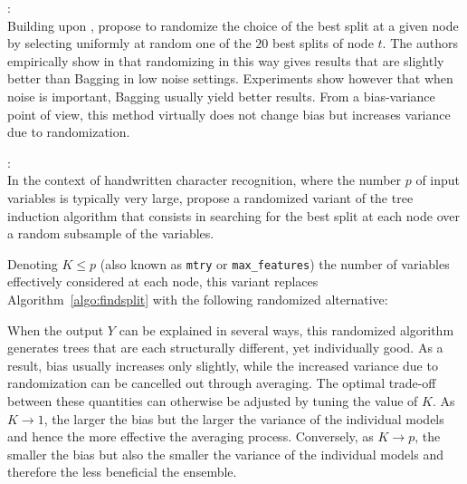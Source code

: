 \begin{description}
\item \citet{dietterich:1995}: \hfill \\
    Building upon \citep{kwok:1990}, \citet{dietterich:1995} propose
    to randomize the choice of the best split at a given node by selecting
    uniformly at random one of the $20$ best splits of node $t$. The authors empirically
    show in \citep{dietterich:1995,dietterich:2000} that randomizing in this
    way gives results that are slightly better than Bagging in low noise settings.
    Experiments show however that when noise is important, Bagging usually
    yield better results. From a bias-variance point of view, this method
    virtually does not change bias but increases variance due to randomization.

\item \citet{amit:1997}: \hfill \\
    In the context of handwritten character recognition, where the number $p$
    of input variables is typically very large, \citet{amit:1997} propose a
    randomized variant of the tree induction algorithm that consists in
    searching for the best split at each node over a random subsample of the
    variables.

    Denoting $K \leq p$\label{ntn:K-split} (also known as \texttt{mtry} or
    \texttt{max\_features}) the number of variables effectively considered at
    each node, this variant replaces Algorithm~\ref{algo:findsplit}
    with the following randomized alternative:
    When the output $Y$ can be explained in several ways, this randomized
    algorithm generates trees that are each structurally different, yet
    individually good. As a result, bias usually increases only slightly, while
    the increased variance due to randomization can be cancelled out through averaging. The
    optimal trade-off between these quantities can otherwise be adjusted by
    tuning the value of $K$. As $K \to 1$, the larger the bias but the larger the
    variance of the individual models and hence the more effective the
    averaging process. Conversely, as $K \to p$, the smaller the bias but also the
    smaller the variance of the individual models and therefore the less
    beneficial the ensemble.


\end{description}
